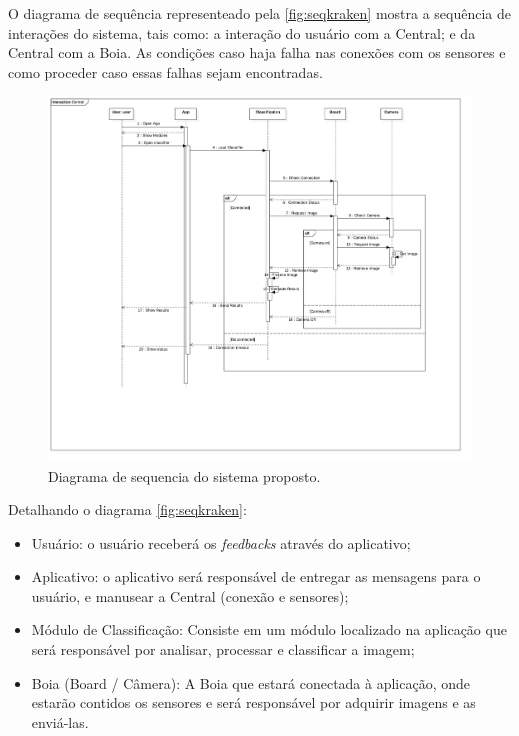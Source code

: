 O diagrama de sequência representeado pela \autoref{fig:seqkraken} mostra a sequência de interações do sistema, tais como: a interação do usuário com a Central; e da Central com a Boia. As condições caso haja falha nas conexões com os sensores e como proceder caso essas falhas sejam encontradas.

\begin{figure}[ht]
	\caption{\label{fig:seqkraken}  Diagrama de sequencia do sistema proposto.}
	 \begin{center}
		\includegraphics[width = 1\textwidth]			{resources/sequencekraken}
    \end{center}
\end{figure}

Detalhando o diagrama \autoref{fig:seqkraken}:
\begin{itemize}
    \item Usuário: o usuário receberá os \textit{feedbacks} através do aplicativo;
    \item Aplicativo: o aplicativo será responsável de entregar as mensagens para o usuário, e manusear a Central (conexão e sensores);
    \item Módulo de Classificação: Consiste em um módulo localizado na aplicação que será responsável por analisar, processar e classificar a imagem;
    \item Boia (Board / Câmera): A Boia que estará conectada à aplicação, onde estarão contidos os sensores e será responsável por adquirir imagens e as enviá-las. 
\end{itemize}


